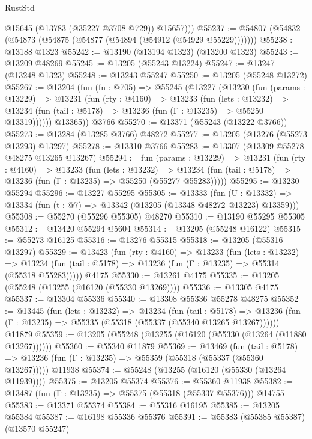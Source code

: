 \begin{lexlean}{RustStd}
\begin{coremodule}
          @15645
          (@13783 (@35227 @3708 @729))
          @15657)))
@55237 := @54807 (@54832 (@54873 (@54875 (@54877 (@54894 (@54912 (@54929 @55229)))))))
@55238 := @13188 @1323
@55242 := @13190 (@13194 @1323) (@13200 @1323)
@55243 := @13209 @48269
@55245 := @13205 (@55243 @13224)
@55247 := @13247 (@13248 @1323)
@55248 := @13243 @55247
@55250 := @13205 (@55248 @13272)
@55267 := @13204
    (fun (fn : @705) =>
    @55245
      (@13227
        (@13230
          (fun (params : @13229) =>
          @13231
            (fun (rty : @4160) =>
            @13233
              (fun (lets : @13232) =>
              @13234 (fun (tail : @5178) => @13236 (fun (Γ : @13235) => @55250 @13319))))))
        @13365))
    @3766
@55270 := @13371 (@55243 (@13222 @3766))
@55273 := @13284 (@13285 @3766) @48272
@55277 := @13205 (@13276 (@55273 @13293) @13297)
@55278 := @13310 @3766
@55283 := @13307 (@13309 @55278 @48275 @13265 @13267)
@55294 := fun (params : @13229) =>
  @13231
    (fun (rty : @4160) =>
    @13233
      (fun (lets : @13232) =>
      @13234 (fun (tail : @5178) => @13236 (fun (Γ : @13235) => @55250 (@55277 @55283)))))
@55295 := @13230 @55294
@55296 := @13227 @55295
@55305 := @13333
    (fun (U : @13332) => @13334 (fun (t : @7) => @13342 (@13205 (@13348 @48272 @13223) @13359)))
@55308 := @55270 (@55296 @55305) @48270
@55310 := @13190 @55295 @55305
@55312 := @13420 @55294 @5604
@55314 := @13205 (@55248 @16122)
@55315 := @55273 @16125
@55316 := @13276 @55315
@55318 := @13205 (@55316 @13297)
@55329 := @13423
    (fun (rty : @4160) =>
    @13233
      (fun (lets : @13232) =>
      @13234 (fun (tail : @5178) => @13236 (fun (Γ : @13235) => @55314 (@55318 @55283)))))
    @4175
@55330 := @13261 @4175
@55335 := @13205 (@55248 (@13255 (@16120 (@55330 @13269))))
@55336 := @13305 @4175
@55337 := @13304 @55336
@55340 := @13308 @55336 @55278 @48275
@55352 := @13445
    (fun (lets : @13232) =>
    @13234
      (fun (tail : @5178) =>
      @13236 (fun (Γ : @13235) => @55335 (@55318 (@55337 (@55340 @13265 @13267))))))
    @11879
@55359 := @13205 (@55248 (@13255 (@16120 (@55330 (@13264 (@11880 @13267))))))
@55360 := @55340 @11879
@55369 := @13469
    (fun (tail : @5178) => @13236 (fun (Γ : @13235) => @55359 (@55318 (@55337 (@55360 @13267)))))
    @11938
@55374 := @55248 (@13255 (@16120 (@55330 (@13264 @11939))))
@55375 := @13205 @55374
@55376 := @55360 @11938
@55382 := @13487 (fun (Γ : @13235) => @55375 (@55318 (@55337 @55376))) @14755
@55383 := @13371 @55374
@55384 := @55316 @16195
@55385 := @13205 @55384
@55387 := @16198 @55336 @55376
@55391 := @55383 (@55385 @55387) (@13570 @55247)

\end{coremodule}
\end{lexlean}
